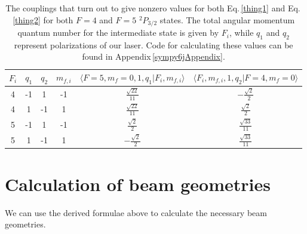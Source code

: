 \begin{table}[h!]
\centering
\begin{tabular}{|c|c|c|c|c|c|}
\hline
$F_i$ & $q_1$ & $q_2$ & $m_{f,i}$&$\langle F=5,m_f=0,1,q_1|F_i,m_{f,i}\rangle$&$\langle F_i,m_{f,i},1,q_2|F=4,m_f=0 \rangle$\\
\hline
4 & -1 & 1 & -1 &$ \frac{\sqrt{22}}{11} $&$ - \frac{\sqrt{2}}{2} $ \\ 
4 & 1 & -1 & 1 &$ \frac{\sqrt{22}}{11} $&$ \frac{\sqrt{2}}{2} $ \\ 
5 & -1 & 1 & -1 &$ \frac{\sqrt{2}}{2} $&$ \frac{\sqrt{33}}{11} $ \\ 
5 & 1 & -1 & 1 &$ - \frac{\sqrt{2}}{2} $&$ \frac{\sqrt{33}}{11} $ \\
\hline
\end{tabular}
\caption{The couplings that turn out to give nonzero values for both Eq.\,\eqref{thing1} and Eq.\,\eqref{thing2} for both $F=4$ and $F=5$ $^2P_{3/2}$ states. The total angular momentum quantum number for the intermediate state is given by $F_i$, while $q_1$ and $q_2$ represent polarizations of our laser. Code for calculating these values can be found in Appendix\,\ref{sympy6jAppendix}.}
\label{nonzeroCG}
\end{table}

\section{Calculation of beam geometries}
We can use the derived formulae above to calculate the necessary beam geometries. %

